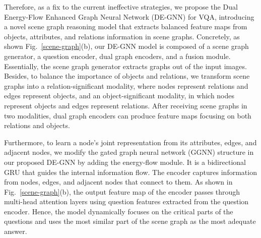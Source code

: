 \documentclass[letterpaper]{article} %
\begin{document}

Therefore, as a fix to the current ineffective strategies, we propose the Dual Energy-Flow Enhanced Graph Neural Network (DE-GNN) for VQA, introducing a novel scene graph reasoning model that extracts balanced feature maps from objects, attributes, and relations information in scene graphs. 
Concretely, as shown Fig.~\ref{scene-graph}(b), our DE-GNN model is composed of a scene graph generator, a question encoder, dual graph encoders, and a fusion module. 
Essentially, the scene graph generator extracts graphs out of the input images. 
Besides, to balance the importance of objects and relations, we transform scene graphs into a relation-significant modality, where nodes represent relations and edges represent objects, and an object-significant modality, in which nodes represent objects and edges represent relations. 
After receiving scene graphs in two modalities, dual graph encoders can produce feature maps focusing on both relations and objects.

Furthermore, to learn a node's joint representation from its attributes, edges, and adjacent nodes, we modify the gated graph neural network (GGNN) structure in our proposed DE-GNN by adding the energy-flow module. It is a bidirectional GRU that guides the internal information flow.
The encoder captures information from nodes, edges, and adjacent nodes that connect to them. 
As shown in Fig.~\ref{scene-graph}(b), the output feature map of the encoder passes through multi-head attention layers using question features extracted from the question encoder. 
Hence, the model dynamically focuses on the critical parts of the questions and uses the most similar part of the scene graph as the most adequate answer.
\end{document}
